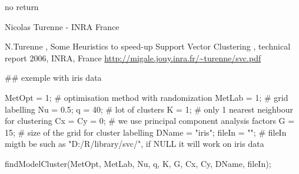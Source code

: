 \begin{Value}
no return
\end{Value}
\begin{Author}\relax
Nicolas Turenne - INRA France 
\end{Author}
\begin{References}\relax
N.Turenne , Some Heuristics to speed-up Support Vector Clustering , technical report 2006, INRA, France 
\url{http://migale.jouy.inra.fr/~turenne/svc.pdf}
\end{References}
\begin{Examples}
\begin{ExampleCode}

## exemple with iris data

MetOpt  = 1;    # optimisation method with randomization
MetLab  = 1;    # grid labelling
Nu      = 0.5; 
q       = 40;   # lot of clusters
K       = 1;    # only 1  nearest neighbour for clustering
Cx = Cy = 0; # we use principal component analysis factors
G       = 15; # size of the grid for cluster labelling
DName   = "iris";
fileIn  = ""; # fileIn migth be such as "D:/R/library/svc/", if NULL it will work on iris data

findModelCluster(MetOpt, MetLab, Nu, q, K, G, Cx, Cy, DName, fileIn); 

\end{ExampleCode}
\end{Examples}


